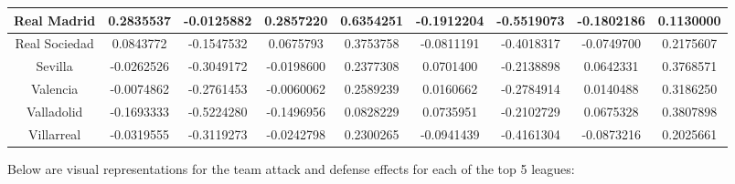 \documentclass[
]{article}
\begin{document}
\begin{table}
\begin{tabular}[t]{c|c|c|c|c|c|c|c|c}
\hline
Real Madrid & 0.2835537 & -0.0125882 & 0.2857220 & 0.6354251 & -0.1912204 & -0.5519073 & -0.1802186 & 0.1130000\\
\hline
Real Sociedad & 0.0843772 & -0.1547532 & 0.0675793 & 0.3753758 & -0.0811191 & -0.4018317 & -0.0749700 & 0.2175607\\
\hline
Sevilla & -0.0262526 & -0.3049172 & -0.0198600 & 0.2377308 & 0.0701400 & -0.2138898 & 0.0642331 & 0.3768571\\
\hline
Valencia & -0.0074862 & -0.2761453 & -0.0060062 & 0.2589239 & 0.0160662 & -0.2784914 & 0.0140488 & 0.3186250\\
\hline
Valladolid & -0.1693333 & -0.5224280 & -0.1496956 & 0.0828229 & 0.0735951 & -0.2102729 & 0.0675328 & 0.3807898\\
\hline
Villarreal & -0.0319555 & -0.3119273 & -0.0242798 & 0.2300265 & -0.0941439 & -0.4161304 & -0.0873216 & 0.2025661\\
\hline
\end{tabular}
\end{table}

Below are visual representations for the team attack and defense effects
for each of the top 5 leagues:
\end{document}
